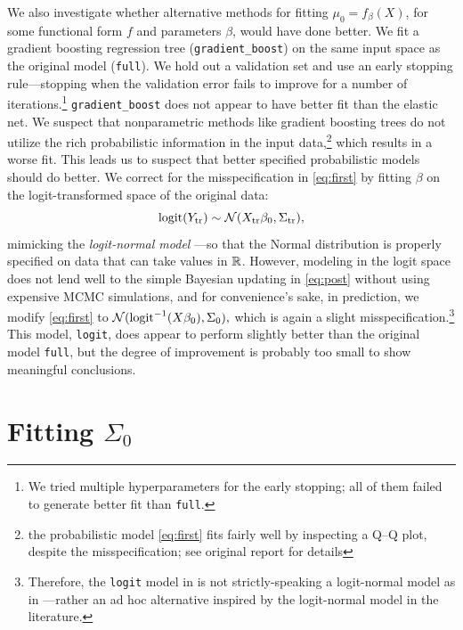 \documentclass[12pt]{article}
\newcommand{\logit}{\operatorname{logit}}
\begin{document}
We also investigate whether alternative methods for fitting $\mu_0 =
f_\beta(X)$, for some functional form $f$ and parameters $\beta$, would have
done better. We fit a gradient boosting regression tree
(\texttt{gradient\_boost}) on the same input space as the original model
(\texttt{full}). We hold out a validation set and use an early stopping
rule---stopping when the validation error fails to improve for a number of
iterations.\footnote{We tried multiple hyperparameters for the early stopping;
all of them failed to generate better fit than \texttt{full}.}
\texttt{gradient\_boost} does not appear to have better fit than the elastic
net. We suspect that nonparametric methods like gradient boosting trees do not
utilize the rich probabilistic information in the input data,\footnote{the probabilistic
model \eqref{eq:first} fits fairly well by inspecting a Q--Q plot, despite the misspecification; see original
report for details} which results in a worse fit. This leads us to suspect that
better specified probabilistic models should do better. We correct for the
misspecification in \eqref{eq:first} by fitting $\beta$ on the logit-transformed
space of the original data: \[
\logit(Y_\text{tr}) \sim \Norm(X_\text{tr}\beta_0, \Sigma_\text{tr}),
\]
mimicking the \emph{logit-normal model} \cite[page 283]{agresti2015foundations}---so that the Normal distribution is properly specified on data that can take values in $\mathbb{R}$. However, modeling in the logit space does not lend well to the simple Bayesian updating in \eqref{eq:post} without using expensive MCMC simulations, and for convenience's sake, in prediction, we modify \eqref{eq:first} to $\Norm(\logit^{-1}(X\beta_0), \Sigma_0),$ which is again a slight misspecification.\footnote{Therefore, the \texttt{logit} model in  is not strictly-speaking a logit-normal model as in \cite{agresti2015foundations}---rather an ad hoc alternative inspired by the logit-normal model in the literature.} This model, \texttt{logit}, does appear to perform slightly better than the original model \texttt{full}, but the degree of improvement is probably too small to show meaningful conclusions.  


\section{Fitting $\Sigma_0$}
\label{sec:sigma}
\end{document}
